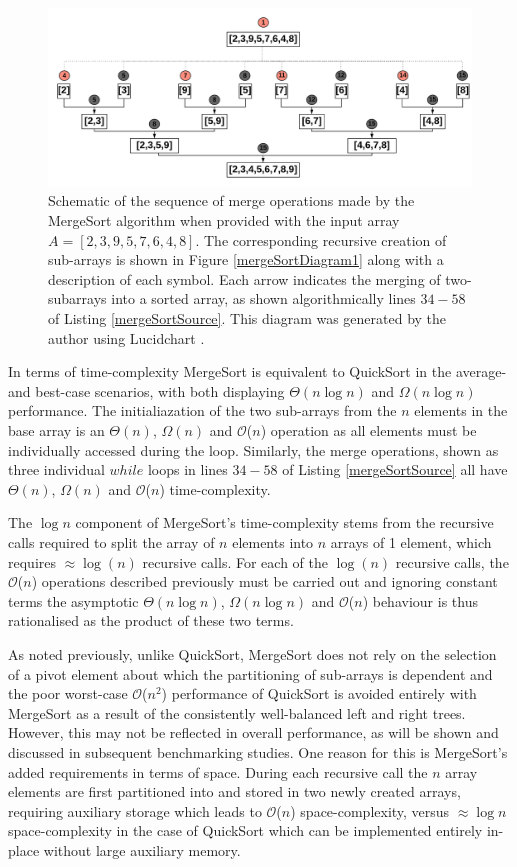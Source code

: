 \documentclass[12pt,a4paper]{article}
\begin{document}
\begin{figure}[t!]
\includegraphics[scale=0.475]{mergesort_merge.png} 
\caption{Schematic of the sequence of merge operations made by the MergeSort algorithm when provided with the input array $A = [2,3,9,5,7,6,4,8]$. The corresponding recursive creation of sub-arrays is shown in Figure \ref{mergeSortDiagram1} along with a description of each symbol. Each arrow indicates the merging of two-subarrays into a sorted array, as shown algorithmically lines $34-58$ of Listing \ref{mergeSortSource}. This diagram was generated by the author using Lucidchart \cite{lucidchart}.}
\label{mergeSortDiagram2}
\end{figure}

In terms of time-complexity MergeSort is equivalent to QuickSort in the average- and best-case scenarios, with both displaying $\Theta(n \log n)$ and $\Omega(n \log n)$ performance. The initialiazation of the two sub-arrays from the $n$ elements in the base array is an $\Theta(n)$, $\Omega(n)$ and $\mathcal{O}$($n$) operation as all elements must be individually accessed during the loop. Similarly, the merge operations, shown as three individual $while$ loops in lines $34-58$ of Listing \ref{mergeSortSource} all have $\Theta(n)$, $\Omega(n)$ and $\mathcal{O}$($n$) time-complexity. 

The $\log n$ component of MergeSort's time-complexity stems from the recursive calls required to split the array of $n$ elements into $n$ arrays of 1 element, which requires $\approx \log(n)$ recursive calls. For each of the $\log(n)$ recursive calls, the $\mathcal{O}$($n$) operations described previously must be carried out and ignoring constant terms the asymptotic $\Theta(n \log n)$, $\Omega(n \log n)$ and $\mathcal{O}$($n$) behaviour is thus rationalised as the product of these two terms. 

As noted previously, unlike QuickSort, MergeSort does not rely on the selection of a pivot element about which the partitioning of sub-arrays is dependent and the poor worst-case $\mathcal{O}$($n^2$) performance of QuickSort is avoided entirely with MergeSort as a result of the consistently well-balanced left and right trees. However, this may not be reflected in overall performance, as will be shown and discussed in subsequent benchmarking studies. One reason for this is MergeSort's added requirements in terms of space. During each recursive call the $n$ array elements are first partitioned into and stored in two newly created arrays, requiring auxiliary storage which leads to $\mathcal{O}$($n$) space-complexity, versus $\approx \log n$ space-complexity in the case of QuickSort which can be implemented entirely in-place without large auxiliary memory.
\end{document}
